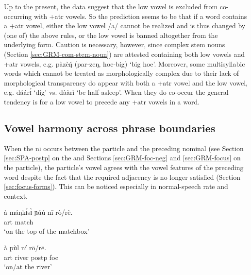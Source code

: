 Up to the present, the data suggest that the low vowel is excluded from 
co-occurring with {\sc +atr}  vowels.  So the prediction seems to be that if a 
word contains a {\sc +atr} vowel,  either the low vowel {/{a}/} cannot be 
realized and is thus changed by (one of) the above rules, or  the  low vowel is 
banned  altogether from the underlying form. Caution is necessary, however, since complex stem nouns (Section \ref{sec:GRM-com-stem-noun}) are attested containing both  low vowels and {\sc +atr} vowels, e.g. {\sls pàzèŋ́} ({\sls par-zeŋ}, {\sc hoe-big})  `big hoe'. Moreover, some multisyllabic words which cannot be treated as morphologically complex  due to their lack of morphological transparency do appear with both  a {\sc +atr} vowel and  the low vowel, e.g. {\sls dáárɪ́} `dig' vs.  {\sls dààrì}  `be half asleep'. When they do co-occur the general tendency is for a low 
vowel to precede any {\sc +atr} vowels in a word. 


\subsection{Vowel harmony across phrase boundaries}
\label{sec:vowel-postposition}

When the   {\sls nɪ}  occurs between the  particle and the preceding nominal (see Section \ref{sec:SPA-postp} on the  and Sections \ref{sec:GRM-foc-neg} and 
\ref{sec:GRM-focus} on the  particle),  the  particle's
vowel agrees with the vowel features of  the  preceding word despite the fact that the 
required adjacency is no longer satisfied (Section  \ref{sec:focus-forms}). This can be noticed  
especially in normal-speech rate and context.


\ea\label{ex:GRM-focus-form}

 
\ea\label{ex:GRM-foc-form-1}
\gll  à máŋkɪ́sɪ̀ ɲúú nī rò/rè.\\
    {\sc art} {match} {\reln} {\postp} {\foc}\\
\glt `on the top of the matchbox'

\ex\label{ex:GRM-foc-form-2}
\gll  à  pùl  ní rō/rē.\\
    {\sc art} {river} {\sc postp}  {\sc foc}\\
\glt `on/at the river'

\z 
 \z


